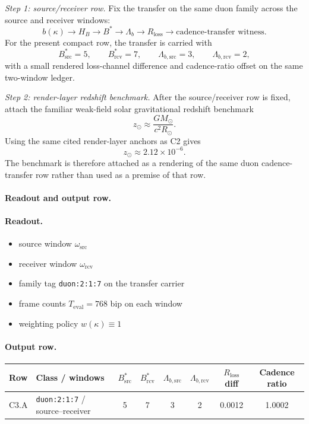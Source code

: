 \textit{Step 1: source/receiver row.} Fix the transfer on the same duon family across the source and receiver windows:
\[
b(\kappa) \longrightarrow H_B \longrightarrow B^* \longrightarrow \Lambda_b \longrightarrow R_{\mathrm{loss}} \longrightarrow \text{cadence-transfer witness}.
\]
For the present compact row, the transfer is carried with
\[
B^*_{\mathrm{src}}=5,\qquad B^*_{\mathrm{rcv}}=7,\qquad \Lambda_{b,\mathrm{src}}=3,\qquad \Lambda_{b,\mathrm{rcv}}=2,
\]
with a small rendered loss-channel difference and cadence-ratio offset on the same two-window ledger.

\textit{Step 2: render-layer redshift benchmark.} After the source/receiver row is fixed, attach the familiar weak-field solar gravitational redshift benchmark
\[
z_\odot \approx \frac{GM_\odot}{c^2 R_\odot}.
\]
Using the same cited render-layer anchors as C2 gives
\[
z_\odot \approx 2.12\times 10^{-6}.
\]
The benchmark is therefore attached as a rendering of the same duon cadence-transfer row rather than used as a premise of that row.

\paragraph{Readout and output row.}
\paragraph{Readout.}
\begin{itemize}
\item source window $\omega_{\mathrm{src}}$
\item receiver window $\omega_{\mathrm{rcv}}$
\item family tag \texttt{duon:2:1:7} on the transfer carrier
\item frame counts $T_{\mathrm{eval}} = 768$ bip on each window
\item weighting policy $w(\kappa)\equiv 1$
\end{itemize}

\paragraph{Output row.}
\begin{center}
\small
\begin{tabularx}{\linewidth}{@{}lXcccccc@{}}
\toprule
Row & Class / windows & $B^*_{\mathrm{src}}$ & $B^*_{\mathrm{rcv}}$ & $\Lambda_{b,\mathrm{src}}$ & $\Lambda_{b,\mathrm{rcv}}$ & $R_{\mathrm{loss}}$ diff & Cadence ratio \\
\midrule
C3.A & \texttt{duon:2:1:7} / source--receiver & 5 & 7 & 3 & 2 & 0.0012 & 1.0002 \\
\bottomrule
\end{tabularx}
\end{center}

